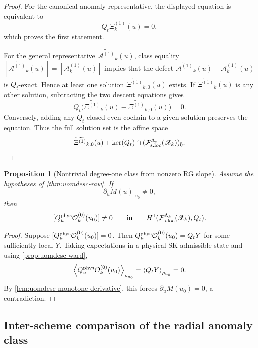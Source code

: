 \documentclass[11pt]{article}
\theoremstyle{definition}
\theoremstyle{plain}
\newtheorem{proposition}[definition]{Proposition}
\theoremstyle{remark}
\newcommand{\Fsloc}{\mathcal F_{\rm s.loc}}
\newcommand{\Xscr}{\mathscr X}
\newcommand{\Ozero}{\mathcal O^{(0)}}
\newcommand{\Aone}{\mathcal A^{(1)}}
\newcommand{\Xione}{\Xi^{(1)}}
\newcommand{\Qt}{Q_t}
\newcommand{\Quphys}{Q_u^{\rm phys}}
\newcommand{\pair}[1]{\left\langle #1 \right\rangle}
\begin{document}
\begin{proof}
For the canonical anomaly representative, the displayed equation is equivalent to
\[
\Qt\Xione_k(u)=0,
\]
which proves the first statement.

For the general representative \(\widetilde{\Aone}_k(u)\), class equality
\(
[\widetilde{\Aone}_k(u)]=[\Aone_k(u)]
\)
implies that the defect
\(
\widetilde{\Aone}_k(u)-\Aone_k(u)
\)
is \(\Qt\)-exact.
Hence at least one solution \(\widetilde{\Xione}_{k,0}(u)\) exists.
If \(\widetilde{\Xione}_k(u)\) is any other solution, subtracting the two descent equations gives
\[
\Qt\big(\widetilde{\Xione}_k(u)-\widetilde{\Xione}_{k,0}(u)\big)=0.
\]
Conversely, adding any \(\Qt\)-closed even cochain to a given solution preserves the equation.
Thus the full solution set is the affine space
\[
\widetilde{\Xione}_{k,0}(u)+
\ker(\Qt)\cap(\Fsloc^{\Lambda_k}(\Xscr_k))_{\bar 0}.
\]
\end{proof}

\begin{proposition}[Nontrivial degree-one class from nonzero RG slope]
\label{prop:uomdesc-degree-one}
Assume the hypotheses of \cref{thm:uomdesc-raw}.
If
\[
\partial_u M(u)\big|_{u_0}\neq 0,
\]
then
\[
[\Quphys\Ozero_k(u_0)]\neq 0
\qquad\text{in}\qquad
H^1(\Fsloc^{\Lambda_k}(\Xscr_k),\Qt).
\]
\end{proposition}

\begin{proof}
Suppose \([\Quphys\Ozero_k(u_0)]=0\).
Then \(\Quphys\Ozero_k(u_0)=\Qt Y\) for some sufficiently local \(Y\).
Taking expectations in a physical SK-admissible state and using \cref{prop:uomdesc-ward},
\[
\pair{\Quphys\Ozero_k(u_0)}_{\rho_{u_0}}
=
\pair{\Qt Y}_{\rho_{u_0}}
=0.
\]
By \cref{lem:uomdesc-monotone-derivative}, this forces \(\partial_u M(u_0)=0\), a contradiction.
\end{proof}

\subsection{Inter-scheme comparison of the radial anomaly class}
\end{document}
